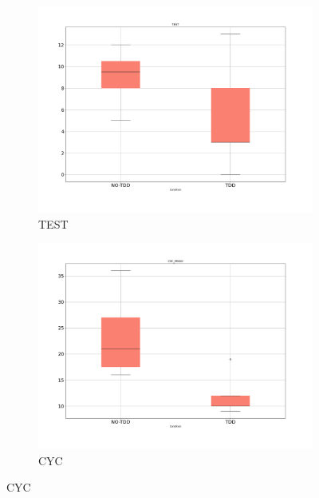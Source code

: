 \begin{figure}[htbp]
    \begin{subfigure}{0.5\textwidth}
        \includegraphics[width=\linewidth]{figures/box_plots/task2/TEST.png}
        \caption{TEST}
        \label{bp_task2_test}
    \end{subfigure}\hfil
    \begin{subfigure}{0.5\textwidth}
        \includegraphics[width=\linewidth]{figures/box_plots/task2/CYC.png}
        \caption{CYC}
        \label{bp_task2_cyc}
    \end{subfigure}

    \medskip


\end{figure}
